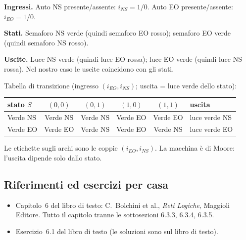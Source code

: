 \documentclass[11pt,a4paper]{article}
\begin{document}
\textbf{Ingressi.} Auto NS presente/assente: $i_{NS} = 1/0$. Auto EO presente/assente: $i_{EO} = 1/0$.

\textbf{Stati.} Semaforo NS verde (quindi semaforo EO rosso); semaforo EO verde (quindi semaforo NS rosso).

\textbf{Uscite.} Luce NS verde (quindi luce EO rossa); luce EO verde (quindi luce NS rossa). Nel nostro caso le uscite coincidono con gli stati.

Tabella di transizione (ingresso $(i_{EO}, i_{NS})$; uscita = luce verde dello stato):
\begin{center}
\begin{tabular}{lccccl}
\toprule
stato $S$ & $(0,0)$ & $(0,1)$ & $(1,0)$ & $(1,1)$ & uscita\\
\midrule
Verde NS & Verde NS & Verde NS & Verde EO & Verde EO & luce verde NS\\
Verde EO & Verde EO & Verde NS & Verde EO & Verde NS & luce verde EO\\
\bottomrule
\end{tabular}
\end{center}

\begin{center}
\end{center}
Le etichette sugli archi sono le coppie $(i_{EO}, i_{NS})$. La macchina è di Moore: l'uscita dipende solo dallo stato.

\subsection{Riferimenti ed esercizi per casa}

\begin{itemize}
    \item Capitolo~6 del libro di testo: C.~Bolchini et al., \emph{Reti Logiche}, Maggioli Editore. Tutto il capitolo tranne le sottosezioni 6.3.3, 6.3.4, 6.3.5.
    \item Esercizio~6.1 del libro di testo (le soluzioni sono sul libro di testo).
\end{itemize}
\end{document}
